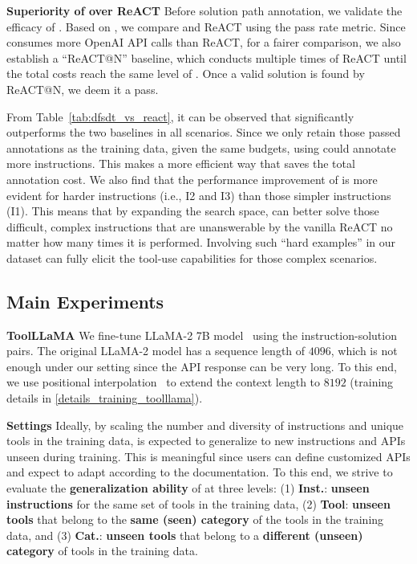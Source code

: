 \textbf{Superiority of \dfs over ReACT} \quad
Before solution path annotation, we validate the efficacy of \dfs.
Based on \turbo, we compare \dfs and ReACT using the pass rate metric. Since \dfs consumes more OpenAI API calls than ReACT, for a fairer comparison, we also establish a ``ReACT@N'' baseline, which conducts multiple times of ReACT until the total costs reach the same level of \dfs. 
Once a valid solution is found by ReACT@N, we deem it a pass.

From Table~\ref{tab:dfsdt_vs_react}, it can be observed that \dfs significantly outperforms the two baselines in all scenarios. Since we only retain those passed annotations as the training data, given the same budgets, using \dfs could annotate more instructions. This makes \dfs a more efficient way that saves the total annotation cost.
We also find that the performance improvement of \dfs is more evident for harder instructions (i.e., I2 and I3) than those simpler instructions (I1). This means that by expanding the search space, \dfs can better solve those difficult, complex instructions that are unanswerable by the vanilla ReACT no matter how many times it is performed. Involving such ``hard examples'' in our dataset can fully elicit the tool-use capabilities for those complex scenarios.

\subsection{Main Experiments}
\label{sec:main_exp}

\textbf{ToolLLaMA} \quad
We fine-tune LLaMA-2 7B model~\citep{touvron2023llama2} using the instruction-solution pairs. The original LLaMA-2 model has a sequence length of $4096$, which is not enough under our setting since the API response can be very long. To this end, we use positional interpolation~\citep{chen2023extending} to extend the context length to $8192$ (training details in \cref{details_training_toolllama}).

\textbf{Settings} \quad
Ideally, by scaling the number and diversity of instructions and unique tools in the training data, \ourmodel is expected to generalize to new instructions and APIs unseen during training. This is meaningful since users can define customized APIs and expect \ourmodel to adapt according to the documentation.
To this end, we strive to evaluate the \textbf{generalization ability} of \ourmodel at three levels: (1) \textbf{Inst.}: \textbf{unseen instructions} for the same set of tools in the training data, (2) \textbf{Tool}: \textbf{unseen tools} that belong to the \textbf{same (seen) category} of the tools in the training data, and (3) \textbf{Cat.}: \textbf{unseen tools} that belong to a \textbf{different (unseen) category} of tools in the training data.

